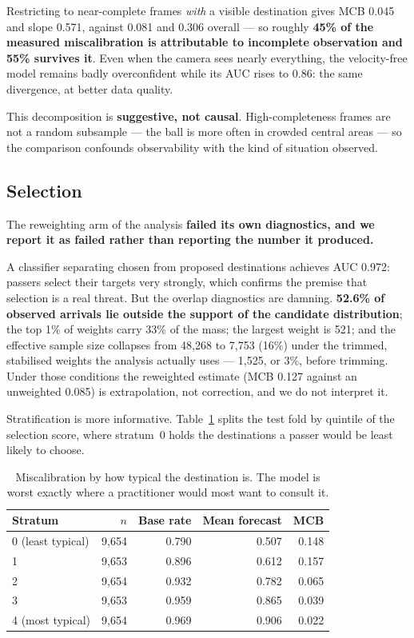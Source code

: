 \documentclass[11pt,a4paper]{article}
\begin{document}
Restricting to near-complete frames \emph{with} a visible destination gives
MCB 0.045 and slope 0.571, against 0.081 and 0.306 overall --- so roughly
\textbf{45\% of the measured miscalibration is attributable to incomplete
observation and 55\% survives it}. Even when the camera sees nearly everything,
the velocity-free model remains badly overconfident while its AUC rises to 0.86:
the same divergence, at better data quality.

This decomposition is \textbf{suggestive, not causal}. High-completeness frames
are not a random subsample --- the ball is more often in crowded central areas ---
so the comparison confounds observability with the kind of situation observed.

\subsection{Selection}
\label{sec:selection}

\begin{plainbox}
\small
The reweighting arm of the analysis \textbf{failed its own diagnostics, and we
report it as failed rather than reporting the number it produced.}
\end{plainbox}

A classifier separating chosen from proposed destinations achieves AUC 0.972:
passers select their targets very strongly, which confirms the premise that
selection is a real threat. But the overlap diagnostics are damning.
\textbf{52.6\% of observed arrivals lie outside the support of the candidate
distribution}; the top 1\% of weights carry 33\% of the mass; the largest weight
is 521; and the effective sample size collapses from 48{,}268 to 7{,}753 (16\%)
under the trimmed, stabilised weights the analysis actually uses --- 1{,}525, or
3\%, before trimming. Under those conditions the reweighted estimate (MCB 0.127
against an unweighted 0.085) is extrapolation, not correction, and we do not
interpret it.

Stratification is more informative. Table~\ref{tab:strat} splits the test fold by
quintile of the selection score, where stratum~0 holds the destinations a passer
would be least likely to choose.

\begin{table}[h]
\centering
\small
\caption{Miscalibration by how typical the destination is. The model is worst
exactly where a practitioner would most want to consult it.}
\label{tab:strat}
\begin{tabular}{lrrrr}
\toprule
Stratum & $n$ & Base rate & Mean forecast & MCB \\
\midrule
0 (least typical) & 9{,}654 & 0.790 & 0.507 & 0.148 \\
1                 & 9{,}653 & 0.896 & 0.612 & 0.157 \\
2                 & 9{,}654 & 0.932 & 0.782 & 0.065 \\
3                 & 9{,}653 & 0.959 & 0.865 & 0.039 \\
4 (most typical)  & 9{,}654 & 0.969 & 0.906 & 0.022 \\
\bottomrule
\end{tabular}
\end{table}
\end{document}
